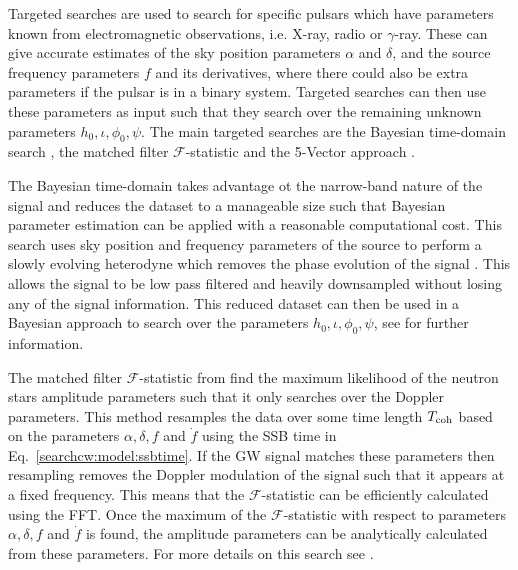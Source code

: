 Targeted searches are used to search for specific
pulsars which have parameters known from electromagnetic observations, i.e.
X-ray, radio or $\gamma$-ray.  These can give accurate estimates of the sky position parameters
$\alpha$ and $\delta$, and the source frequency parameters $f$ and its
derivatives, where there could also be extra parameters if the pulsar is in a
binary system.
Targeted searches can then use these parameters as input such that they search
over the remaining unknown parameters $h_0, \iota, \phi_0, \psi$.  The
main targeted searches are the Bayesian time-domain search
\citep{dupuis2005BayesianEstimation}, the matched filter
$\mathcal{F}$-statistic \citep{schutz1998DataAnalysis} and the 5-Vector
approach \citep{astone2010MethodDetection}.

The Bayesian time-domain takes advantage ot the narrow-band nature of the signal and reduces the dataset to a manageable size such that Bayesian parameter
estimation can be applied with a reasonable computational cost.  This search
uses sky position and frequency parameters of the source to perform a slowly
evolving heterodyne which removes the phase evolution of the signal
\citep{dupuis2005BayesianEstimation}.  This allows
the signal to be low pass filtered and heavily downsampled without losing any
of the signal information.  This reduced dataset can then be used in a Bayesian
approach to search over the parameters $h_0, \iota, \phi_0, \psi$, see
\citep{dupuis2005BayesianEstimation} for further information.  

The matched filter $\mathcal{F}$-statistic from \citep{schutz1998DataAnalysis} find the maximum likelihood of the neutron stars amplitude parameters such that it only searches over the Doppler parameters. 
This method resamples the data over some time length $T_{\rm coh}$ based on the parameters $\alpha, \delta, f$ and $\dot{f}$ using the \gls{SSB} time in Eq.~\ref{searchcw:model:ssbtime}.
If the \gls{GW} signal matches these parameters then resampling removes the Doppler modulation of the signal such that it appears at a fixed frequency.
This means that the $\mathcal{F}$-statistic can be efficiently calculated using the \gls{FFT}. 
Once the maximum of the $\mathcal{F}$-statistic with respect to parameters $\alpha, \delta, f$ and $\dot{f}$  is found, the amplitude parameters can be analytically calculated from these parameters.
For more details on this search see \citep{schutz1998DataAnalysis,brady2000SearchingPeriodic,prix2007SearchContinuous,
aasi2014GRAVITATIONALWAVES}.

